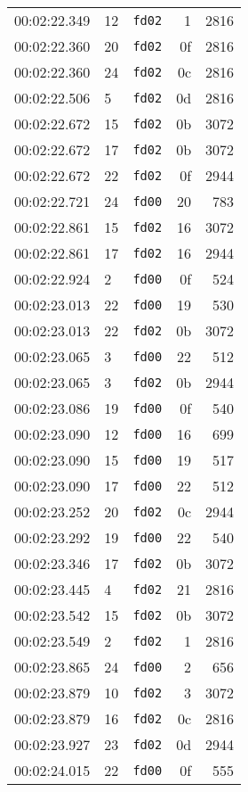 \documentclass{article}
\begin{document}
\begin{longtable}{lllrr}
00:02:22.349 & 12 & \texttt{fd02} & 1 & 2816 \\
00:02:22.360 & 20 & \texttt{fd02} & 0f & 2816 \\
00:02:22.360 & 24 & \texttt{fd02} & 0c & 2816 \\
00:02:22.506 & 5 & \texttt{fd02} & 0d & 2816 \\
00:02:22.672 & 15 & \texttt{fd02} & 0b & 3072 \\
00:02:22.672 & 17 & \texttt{fd02} & 0b & 3072 \\
00:02:22.672 & 22 & \texttt{fd02} & 0f & 2944 \\
00:02:22.721 & 24 & \texttt{fd00} & 20 & 783 \\
00:02:22.861 & 15 & \texttt{fd02} & 16 & 3072 \\
00:02:22.861 & 17 & \texttt{fd02} & 16 & 2944 \\
00:02:22.924 & 2 & \texttt{fd00} & 0f & 524 \\
00:02:23.013 & 22 & \texttt{fd00} & 19 & 530 \\
00:02:23.013 & 22 & \texttt{fd02} & 0b & 3072 \\
00:02:23.065 & 3 & \texttt{fd00} & 22 & 512 \\
00:02:23.065 & 3 & \texttt{fd02} & 0b & 2944 \\
00:02:23.086 & 19 & \texttt{fd00} & 0f & 540 \\
00:02:23.090 & 12 & \texttt{fd00} & 16 & 699 \\
00:02:23.090 & 15 & \texttt{fd00} & 19 & 517 \\
00:02:23.090 & 17 & \texttt{fd00} & 22 & 512 \\
00:02:23.252 & 20 & \texttt{fd02} & 0c & 2944 \\
00:02:23.292 & 19 & \texttt{fd00} & 22 & 540 \\
00:02:23.346 & 17 & \texttt{fd02} & 0b & 3072 \\
00:02:23.445 & 4 & \texttt{fd02} & 21 & 2816 \\
00:02:23.542 & 15 & \texttt{fd02} & 0b & 3072 \\
00:02:23.549 & 2 & \texttt{fd02} & 1 & 2816 \\
00:02:23.865 & 24 & \texttt{fd00} & 2 & 656 \\
00:02:23.879 & 10 & \texttt{fd02} & 3 & 3072 \\
00:02:23.879 & 16 & \texttt{fd02} & 0c & 2816 \\
00:02:23.927 & 23 & \texttt{fd02} & 0d & 2944 \\
00:02:24.015 & 22 & \texttt{fd00} & 0f & 555 \\

\end{longtable}
\end{document}
